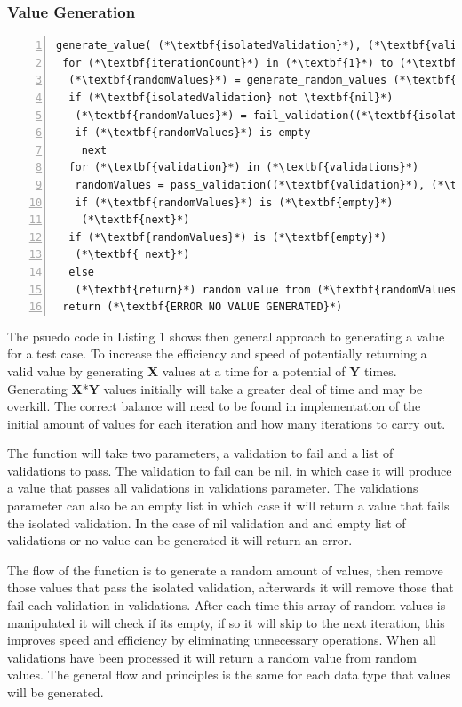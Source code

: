 \documentclass[a4paper,12pt]{article}
\begin{document}
\subsubsection{Value Generation}
\begin{lstlisting}[frame=single,numbers=left,caption= {Pseudo code for value generation} label={psuedo:value}]
generate_value( (*\textbf{isolatedValidation}*), (*\textbf{validations}*))
 for (*\textbf{iterationCount}*) in (*\textbf{1}*) to (*\textbf{X}*)
  (*\textbf{randomValues}*) = generate_random_values (*\textbf{Y}*)
  if (*\textbf{isolatedValidation} not \textbf{nil}*)
   (*\textbf{randomValues}*) = fail_validation((*\textbf{isolatedValidation}*), (*\textbf{randomValues}*))
   if (*\textbf{randomValues}*) is empty
    next
  for (*\textbf{validation}*) in (*\textbf{validations}*)
   randomValues = pass_validation((*\textbf{validation}*), (*\textbf{randomValues}*))
   if (*\textbf{randomValues}*) is (*\textbf{empty}*)
    (*\textbf{next}*)
  if (*\textbf{randomValues}*) is (*\textbf{empty}*)
   (*\textbf{ next}*)
  else
   (*\textbf{return}*) random value from (*\textbf{randomValues}*)
 return (*\textbf{ERROR NO VALUE GENERATED}*)
\end{lstlisting}

\par The psuedo code in Listing 1 shows then general approach to generating a value for a test case. To increase the efficiency and speed of potentially returning a valid value by generating \textbf{X} values at a time for a potential of \textbf{Y} times. Generating \textbf{X}*\textbf{Y} values initially will take a greater deal of time and may be overkill. The correct balance will need to be found in implementation of the initial amount of values for each iteration and how many iterations to carry out.
\vspace{3mm}
\par The function will take two parameters, a validation to fail and a list of validations to pass. The validation to fail can be nil, in which case it will produce a value that passes all validations in validations parameter. The validations parameter can also be an empty list in which case it will return a value that fails the isolated validation. In the case of nil validation and and empty list of validations or no value can be generated it will return an error.
\vspace{3mm}
\par The flow of the function is to generate a random amount of values, then remove those values that pass the isolated validation, afterwards it will remove those that fail each validation in validations. After each time this array of random values is manipulated it will check if its empty, if so it will skip to the next iteration, this improves speed and efficiency by eliminating unnecessary operations. When all validations have been processed it will return a random value from random values. The general flow and principles is the same for each data type that values will be generated.
\end{document}
